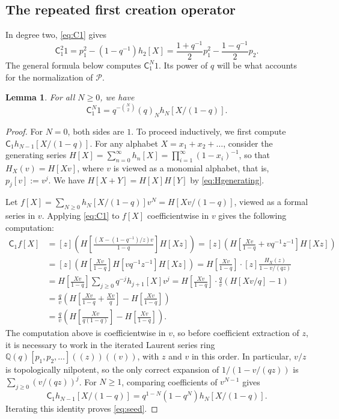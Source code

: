 \documentclass[12pt,reqno]{amsart}
\numberwithin{equation}{section}
\newtheorem{lemma}[theorem]{Lemma}
\theoremstyle{definition}
\theoremstyle{remark}
\theoremstyle{plain}
\newcommand{\QQ}{\mathbb Q}
\newcommand{\Cop}{\mathsf C}
\newcommand{\Pseries}{\mathscr P}
\begin{document}
\subsection{The repeated first creation operator}
In degree two, \eqref{eq:C1} gives
\[
 \Cop_1^2 1=p_1^2-(1-q^{-1})h_2[X]
 =\frac{1+q^{-1}}2p_1^2-\frac{1-q^{-1}}2p_2.
\]
The general formula below computes $\Cop_1^N 1$.  Its power of $q$ will be what accounts for the normalization of $\Pseries$.


\begin{lemma}\label{lem:seed}
For all $N\ge0$, we have
\begin{equation}\label{eq:seed}
 \Cop_1^N1=q^{-\binom N2}(q)_N h_N[X/(1-q)].
\end{equation}
\end{lemma}
\begin{proof}
For $N=0$, both sides are $1$. To proceed inductively, we first compute $\Cop_1h_{N-1}[X/(1-q)]$. For any alphabet $X=x_1+x_2+\dots$, consider the generating series $H[X]=\sum_{n=0}^\infty h_n[X]=\prod_{i=1}^\infty (1-x_i)^{-1}$, so that $H_X(v)=H[Xv]$, where $v$ is viewed as a monomial alphabet, that is, $p_j[v]:=v^j$. We have $H[X+Y]=H[X]H[Y]$ by \eqref{eq:Hgenerating}.

Let $f[X]=\sum_{N\ge 0} h_N[X/(1-q)]v^N=H[Xv/(1-q)]$, viewed as a formal series in $v$. Applying \eqref{eq:C1} to $f[X]$ coefficientwise in $v$ gives the following computation: 
\[
 \begin{aligned}
 \Cop_1f[X]&=[z]\left(H\left[\frac{(X-(1-q^{-1})/z)v}{1-q}\right]H[Xz]\right)
 =[z]\left(H\left[\frac{Xv}{1-q}+vq^{-1}z^{-1}\right]H[Xz]\right)\\
 &=[z]\left(H\left[\frac{Xv}{1-q}\right]H[vq^{-1}z^{-1}]H[Xz]\right)
 =H\left[\frac{Xv}{1-q}\right]\cdot [z]\frac{H_X(z)}{1-v/(qz)}\\
 &=H\left[\frac{Xv}{1-q}\right]\sum_{j\ge0}q^{-j}h_{j+1}[X]v^j
 =H\left[\frac{Xv}{1-q}\right] \cdot \frac{q}{v}(H[Xv/q]-1)\\
 &=\frac{q}{v}\left(H\left[\frac{Xv}{1-q}+\frac{Xv}{q}\right]-H\left[\frac{Xv}{1-q}\right]\right)\\
 &=\frac{q}{v}\left(H\left[\frac{Xv}{q(1-q)}\right]-H\left[\frac{Xv}{1-q}\right]\right).
 \end{aligned}
\]
The computation above is coefficientwise in $v$, so before coefficient extraction of $z$, it is necessary to work in the iterated Laurent series ring $\QQ(q)[p_1,p_2,\dots]((z))((v))$, with $z$ and $v$ in this order. In particular, $v/z$ is topologically nilpotent, so the only correct expansion of $1/(1-v/(qz))$ is $\sum_{j\ge 0} (v/(qz))^j$.
For $N\ge 1$, comparing coefficients of $v^{N-1}$ gives
\[
 \Cop_1h_{N-1}[X/(1-q)]=q^{1-N}(1-q^N)h_N[X/(1-q)].
\]
Iterating this identity proves \eqref{eq:seed}.
\end{proof}
\end{document}
